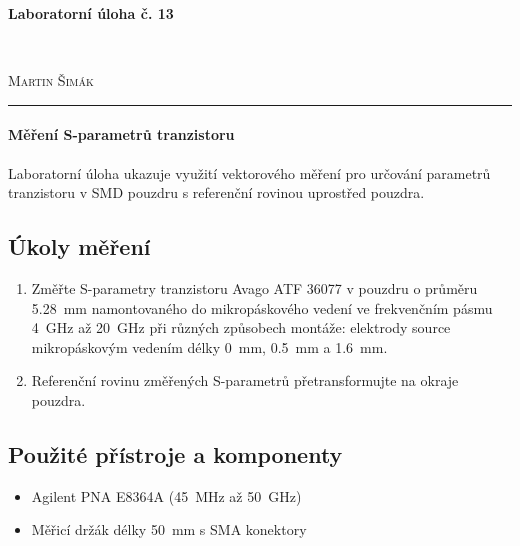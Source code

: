 \documentclass[11pt,a4paper]{article}
\begin{document}

\begin{center}
    {\LARGE\textbf{Laboratorní úloha č. 13}}\\[3mm]
    \begin{minipage}{0.4\textwidth}
        \begin{flushleft}
            \textsc{}
        \end{flushleft}
    \end{minipage}
    ~
    \begin{minipage}{0.4\textwidth}
        \begin{flushright}
            \textsc{Martin Šimák}
        \end{flushright}
    \end{minipage}
    \noindent\rule{14.5cm}{0.4pt}
\end{center}

\paragraph*{Měření S-parametrů tranzistoru} Laboratorní úloha ukazuje využití vektorového měření pro určování parametrů tranzistoru v SMD pouzdru s referenční rovinou uprostřed pouzdra.

\subsection*{Úkoly měření}
\begin{enumerate}
    \item Změřte S-parametry tranzistoru Avago ATF 36077 v pouzdru o průměru 5.28~mm namontovaného do mikropáskového vedení ve frekvenčním pásmu 4~GHz až 20~GHz při různých způsobech montáže: elektrody source  mikropáskovým vedením délky 0~mm, 0.5~mm a 1.6~mm.
    \item Referenční rovinu změřených S-parametrů přetransformujte na okraje pouzdra.
\end{enumerate}

\subsection*{Použité přístroje a komponenty}
\begin{itemize}
    \item Agilent PNA E8364A (45~MHz až 50~GHz)
    \item Měřicí držák délky 50~mm s SMA konektory
\end{itemize}
\end{document}
